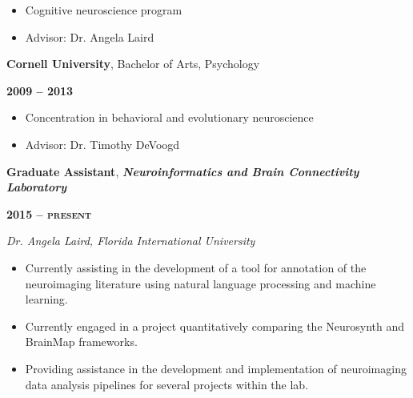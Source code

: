 \documentclass[10pt]{article}
\newcommand{\sectionstyle}{\LARGE \fontfamily{pcr}\selectfont}
\begin{document}
\begin{itemize}[noitemsep, nolistsep]
\item
  Cognitive neuroscience program
\item
  Advisor: Dr. Angela Laird
\end{itemize}

\bigskip

\begin{minipage}[t]{.7\linewidth}
\flushleft
\noindent
\textbf{Cornell University}, Bachelor of Arts, Psychology
\end{minipage}
\hfill
\begin{minipage}[t]{.3\linewidth}
\flushright
\noindent
\textsc{\textbf{2009 -- 2013}}
\end{minipage}

\begin{itemize}[noitemsep, nolistsep]
\item
  Concentration in behavioral and evolutionary neuroscience
\item
  Advisor: Dr. Timothy DeVoogd
\end{itemize}

\bigskip

\begin{center}\sectionstyle{EXPERIENCE}\end{center}

\begin{minipage}[t]{.8\linewidth}
\flushleft
\noindent
\textbf{Graduate Assistant}, \emph{\textbf{Neuroinformatics and Brain Connectivity Laboratory}}
\end{minipage}
\hfill
\begin{minipage}[t]{.2\linewidth}
\flushright
\noindent
\textsc{\textbf{2015 -- present}}
\end{minipage}

\emph{Dr. Angela Laird, Florida International University}

\begin{itemize}[noitemsep, nolistsep]
\item
  Currently assisting in the development of a tool for annotation of the
  neuroimaging literature using natural language processing and machine
  learning.
\item
  Currently engaged in a project quantitatively comparing the Neurosynth
  and BrainMap frameworks.
\item
  Providing assistance in the development and implementation of
  neuroimaging data analysis pipelines for several projects within the
  lab.
\end{itemize}
\end{document}
